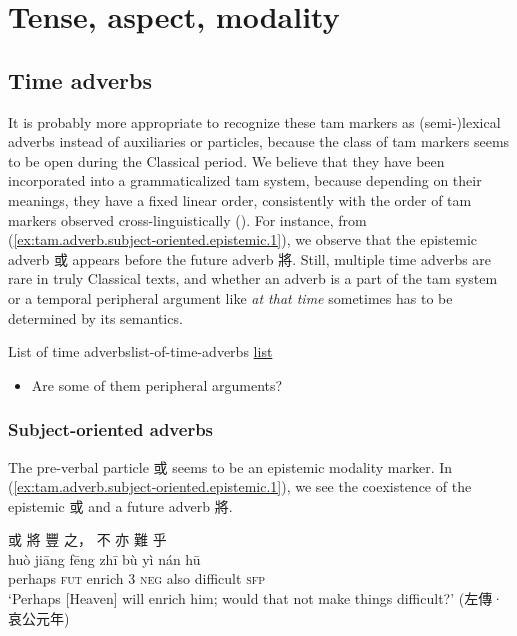 \documentclass[UTF8, a4paper, oneside, scheme=plain, 12pt]{ctexrep}
\newcommand{\form}[1]{\emph{#1}}
\newcommand{\translate}[1]{`#1'}
\newcommand*{\category}[1]{\textsc{#1}}
\begin{document}
\chapter{Tense, aspect, modality}

\section{Time adverbs}\label{sec:tam.adverbs}

It is probably more appropriate to recognize these \ac{tam} markers as (semi-)lexical adverbs instead of auxiliaries or particles,
because the class of \ac{tam} markers seems to be open during the Classical period.
We believe that they have been incorporated into a grammaticalized \ac{tam} system,
because depending on their meanings, they have a fixed linear order,
consistently with the order of \ac{tam} markers observed cross-linguistically 
().
For instance, from (\ref{ex:tam.adverb.subject-oriented.epistemic.1}),
we observe that the epistemic adverb 或 appears before the future adverb 將.
Still, multiple time adverbs are rare in truly Classical texts,
and whether an adverb is a part of the \ac{tam} system or a temporal peripheral argument like \form{at that time} sometimes has to be determined by its semantics.


\begin{todobox}{List of time adverbs}{list-of-time-adverbs}
    \href{http://www.ziyexing.com/files-5/guhanyu/guhanyu_3_3.htm}{list}

    \begin{itemize}
        \item Are some of them peripheral arguments?
    \end{itemize}
\end{todobox}

\subsection{Subject-oriented adverbs}

The pre-verbal particle 或 seems to be an epistemic modality marker.
In (\ref{ex:tam.adverb.subject-oriented.epistemic.1}),
we see the coexistence of the epistemic 或 and a future adverb 將.

\begin{exe}
    \ex\label{ex:tam.adverb.subject-oriented.epistemic.1}
    \glll 或 將 豐 之， 不 亦 難 乎 \\
    huò jiāng fēng zhī bù yì nán hū \\
    perhaps \category{fut} enrich 3 \category{neg} also difficult \category{sfp} \\
    \glt\translate{Perhaps [Heaven] will enrich him; would that not make things difficult?} \hfill (左傳·哀公元年)
\end{exe}
\end{document}
